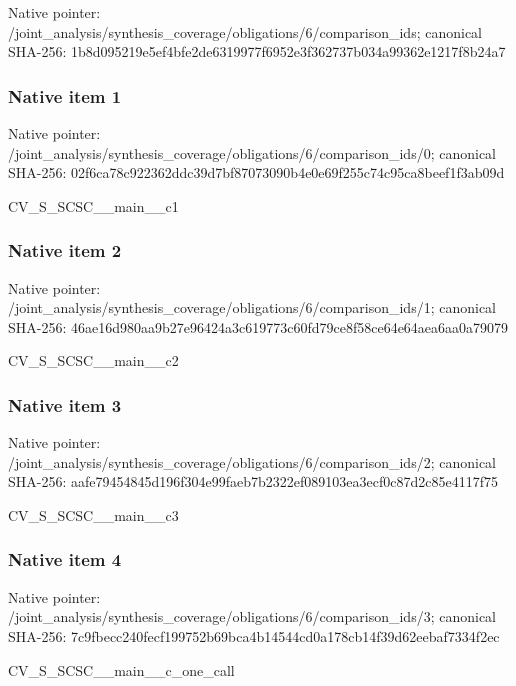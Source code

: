 \documentclass[10pt,a4paper]{article}
\begin{document}
Native pointer: /joint\_analysis/synthesi\allowbreak{}s\_coverage/obligations/6\allowbreak{}/comparison\_ids; canonical SHA-256: 1b8d095219e5ef4bfe2de631\allowbreak{}9977f6952e3f362737b034a9\allowbreak{}9362e1217f8b24a7



\subsubsection{Native item 1}


Native pointer: /joint\_analysis/synthesi\allowbreak{}s\_coverage/obligations/6\allowbreak{}/comparison\_ids/0; canonical SHA-256: 02f6ca78c922362ddc39d7bf\allowbreak{}87073090b4e0e69f255c74c9\allowbreak{}5ca8beef1f3ab09d


CV\_S\_SCSC\_\_main\_\_c1


\subsubsection{Native item 2}


Native pointer: /joint\_analysis/synthesi\allowbreak{}s\_coverage/obligations/6\allowbreak{}/comparison\_ids/1; canonical SHA-256: 46ae16d980aa9b27e96424a3\allowbreak{}c619773c60fd79ce8f58ce64\allowbreak{}e64aea6aa0a79079


CV\_S\_SCSC\_\_main\_\_c2


\subsubsection{Native item 3}


Native pointer: /joint\_analysis/synthesi\allowbreak{}s\_coverage/obligations/6\allowbreak{}/comparison\_ids/2; canonical SHA-256: aafe79454845d196f304e99f\allowbreak{}aeb7b2322ef089103ea3ecf0\allowbreak{}c87d2c85e4117f75


CV\_S\_SCSC\_\_main\_\_c3


\subsubsection{Native item 4}


Native pointer: /joint\_analysis/synthesi\allowbreak{}s\_coverage/obligations/6\allowbreak{}/comparison\_ids/3; canonical SHA-256: 7c9fbecc240fecf199752b69\allowbreak{}bca4b14544cd0a178cb14f39\allowbreak{}d62eebaf7334f2ec


CV\_S\_SCSC\_\_main\_\_c\_one\_call
\end{document}
